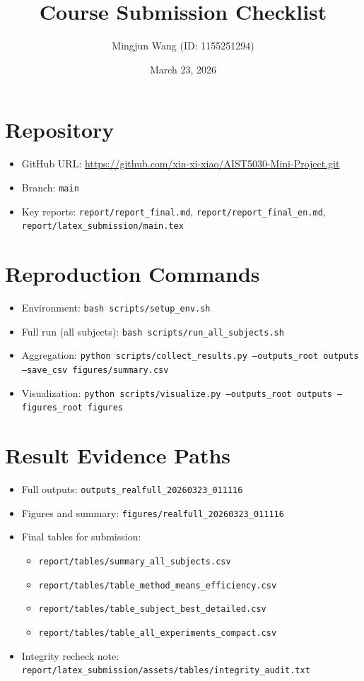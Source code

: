 \documentclass[10pt]{article}
\title{Course Submission Checklist}
\author{Mingjun Wang (ID: 1155251294)}
\date{March 23, 2026}
\begin{document}
\maketitle
\vspace{-1em}
\small

\section*{Repository}
\begin{itemize}
\item GitHub URL: \url{https://github.com/xin-xi-xiao/AIST5030-Mini-Project.git}
\item Branch: \texttt{main}
\item Key reports: \texttt{report/report\_final.md}, \texttt{report/report\_final\_en.md}, \texttt{report/latex\_submission/main.tex}
\end{itemize}

\section*{Reproduction Commands}
\begin{itemize}
\item Environment: \texttt{bash scripts/setup\_env.sh}
\item Full run (all subjects): \texttt{bash scripts/run\_all\_subjects.sh}
\item Aggregation: \texttt{python scripts/collect\_results.py --outputs\_root outputs --save\_csv figures/summary.csv}
\item Visualization: \texttt{python scripts/visualize.py --outputs\_root outputs --figures\_root figures}
\end{itemize}

\section*{Result Evidence Paths}
\begin{itemize}
\item Full outputs: \texttt{outputs\_realfull\_20260323\_011116}
\item Figures and summary: \texttt{figures/realfull\_20260323\_011116}
\item Final tables for submission:
  \begin{itemize}
  \item \texttt{report/tables/summary\_all\_subjects.csv}
  \item \texttt{report/tables/table\_method\_means\_efficiency.csv}
  \item \texttt{report/tables/table\_subject\_best\_detailed.csv}
  \item \texttt{report/tables/table\_all\_experiments\_compact.csv}
  \end{itemize}
\item Integrity recheck note: \texttt{report/latex\_submission/assets/tables/integrity\_audit.txt}
\end{itemize}
\end{document}
